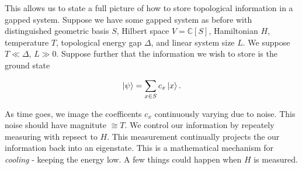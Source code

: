 \documentclass{article}
\theoremstyle{definition}
\newcommand{\CC}{\mathbb{C}}
\newcommand{\0}{\left|0\right>}
\newcommand{\1}{\left|1\right>}
\numberwithin{figure}{section}
\begin{document}
This allows us to state a full picture of how to store topological information in a gapped system. Suppose we have some gapped system as before with distinguished geometric basis $S$, Hilbert space $V=\CC[S]$, Hamiltonian $H$, temperature $T$, topological energy gap $\Delta$, and linear system size $L$. We suppose $T\ll \Delta$, $L\gg 0$. Suppose further that the information we wish to store is the ground state

$$\ket{\psi}=\sum_{x\in S}c_x \ket{x}.$$

As time goes, we image the coefficents $c_x$ continuously varying due to noise. This noise should have magnitute $\cong T$. We control our information by repeately measuring with repsect to $H$. This measurement continually projects the our information back into an eigenstate. This is a mathematical mechanism for \textit{cooling} - keeping the energy low. A few things could happen when $H$ is measured.
\end{document}
